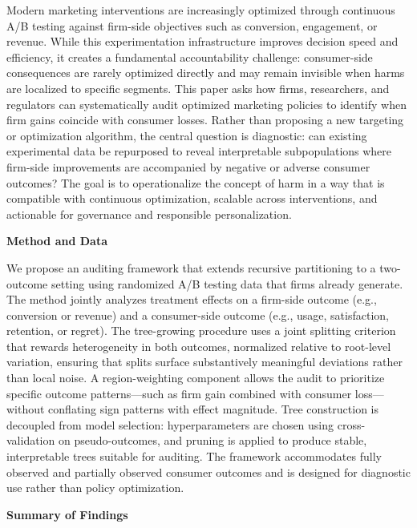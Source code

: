 \documentclass[12pt]{article}
\begin{document}
Modern marketing interventions are increasingly optimized through continuous A/B testing against firm-side objectives such as conversion, engagement, or revenue. While this experimentation infrastructure improves decision speed and efficiency, it creates a fundamental accountability challenge: consumer-side consequences are rarely optimized directly and may remain invisible when harms are localized to specific segments. This paper asks how firms, researchers, and regulators can systematically audit optimized marketing policies to identify when firm gains coincide with consumer losses. Rather than proposing a new targeting or optimization algorithm, the central question is diagnostic: can existing experimental data be repurposed to reveal interpretable subpopulations where firm-side improvements are accompanied by negative or adverse consumer outcomes? The goal is to operationalize the concept of harm in a way that is compatible with continuous optimization, scalable across interventions, and actionable for governance and responsible personalization.

\textbf{Method and Data}

We propose an auditing framework that extends recursive partitioning to a two-outcome setting using randomized A/B testing data that firms already generate. The method jointly analyzes treatment effects on a firm-side outcome (e.g., conversion or revenue) and a consumer-side outcome (e.g., usage, satisfaction, retention, or regret). The tree-growing procedure uses a joint splitting criterion that rewards heterogeneity in both outcomes, normalized relative to root-level variation, ensuring that splits surface substantively meaningful deviations rather than local noise. A region-weighting component allows the audit to prioritize specific outcome patterns—such as firm gain combined with consumer loss—without conflating sign patterns with effect magnitude. Tree construction is decoupled from model selection: hyperparameters are chosen using cross-validation on pseudo-outcomes, and pruning is applied to produce stable, interpretable trees suitable for auditing. The framework accommodates fully observed and partially observed consumer outcomes and is designed for diagnostic use rather than policy optimization.

\textbf{Summary of Findings}
\end{document}
